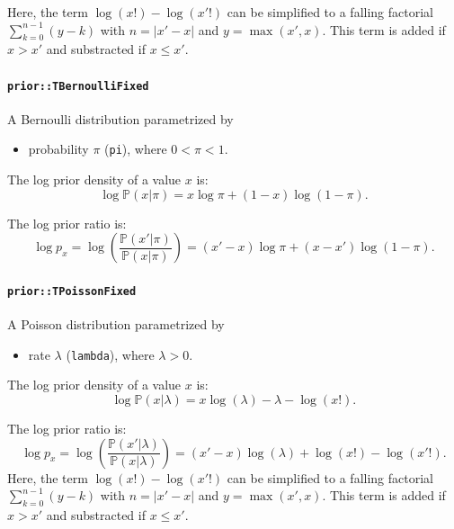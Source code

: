 \documentclass[a4paper,11pt]{article}
\def\p{\mathbb{P}}
\newcommand{\class}[1]{\texttt{#1}}
\newcommand{\privparam}[1]{\texttt{\textunderscore #1}}
\begin{document}
Here, the term $\log(x!) - \log(x'!)$ can be simplified to a falling factorial $\sum_{k=0}^{n-1} (y-k)$ with $n = |x'-x|$ and $y = \max(x', x)$. This term is added if $x > x'$ and substracted if $x \leq x'$.

\paragraph{\class{prior::TBernoulliFixed}}

A Bernoulli distribution parametrized by
\begin{itemize}
 \item probability $\pi$ (\privparam{pi}), where $0 < \pi < 1$.
\end{itemize}

The log prior density of a value $x$ is:
\begin{equation}\label{eq:priorDensBernoulli}
 \log \p(x|\pi) = x \log \pi + (1-x) \log (1-\pi).
\end{equation}

The log prior ratio is:
\begin{equation}\label{eq:priorRatioBernoulli}
 \log p_x = \log \left( \frac{\p(x'|\pi)}{\p(x|\pi)} \right) = (x' - x) \log \pi + (x  - x') \log(1-\pi).
\end{equation}

\paragraph{\class{prior::TPoissonFixed}}

A Poisson distribution parametrized by
\begin{itemize}
 \item rate $\lambda$ (\privparam{lambda}), where $\lambda > 0$.
\end{itemize}

The log prior density of a value $x$ is:
\begin{equation}\label{eq:priorDensPoisson}
 \log \p(x|\lambda) = x \log(\lambda) - \lambda - \log(x!).
\end{equation}

The log prior ratio is:
\begin{equation}\label{eq:priorRatioPoisson}
 \log p_x = \log \left( \frac{\p(x'|\lambda)}{\p(x|\lambda)} \right) = (x' - x) \log(\lambda) + \log(x!) - \log(x'!).
\end{equation}
Here, the term $\log(x!) - \log(x'!)$ can be simplified to a falling factorial $\sum_{k=0}^{n-1} (y-k)$ with $n = |x'-x|$ and $y = \max(x', x)$. This term is added if $x > x'$ and substracted if $x \leq x'$.
\end{document}
